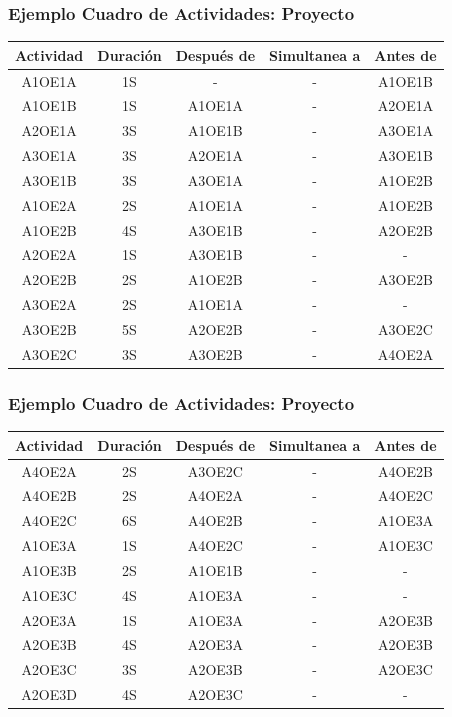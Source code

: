 \documentclass[aspectratio=169]{beamer}%
\begin{document}
\begin{frame}[fragile]
\frametitle{\textbf{Ejemplo Cuadro de Actividades: Proyecto}}
\justifying
\begin{center}
\begin{tabular}{|c|c|c|c|c|}\hline
  \textbf{Actividad}&\textbf{Duración} &\textbf{Después de} & \textbf{Simultanea a} & \textbf{Antes de}\\\hline
A1OE1A& 1S&-      &-&A1OE1B\\\hline
A1OE1B& 1S&A1OE1A &-&A2OE1A\\\hline
A2OE1A& 3S&A1OE1B &-&A3OE1A\\\hline
A3OE1A& 3S&A2OE1A &-&A3OE1B\\\hline
A3OE1B& 3S&A3OE1A &-&A1OE2B\\\hline
A1OE2A& 2S&A1OE1A &-&A1OE2B\\\hline
A1OE2B& 4S&A3OE1B &-&A2OE2B\\\hline
A2OE2A& 1S&A3OE1B &-&-\\\hline
A2OE2B& 2S&A1OE2B &-&A3OE2B\\\hline
A3OE2A& 2S&A1OE1A &-&-\\\hline
A3OE2B& 5S&A2OE2B &-&A3OE2C\\\hline
A3OE2C& 3S&A3OE2B &-&A4OE2A\\\hline
\end{tabular}
\end{center}
\end{frame}

\begin{frame}[fragile]
\frametitle{\textbf{Ejemplo Cuadro de Actividades: Proyecto}}
\justifying
\begin{center}
\begin{tabular}{|c|c|c|c|c|}\hline
  \textbf{Actividad}&\textbf{Duración} &\textbf{Después de} & \textbf{Simultanea a} & \textbf{Antes de}\\\hline
A4OE2A& 2S&A3OE2C &-&A4OE2B\\\hline
A4OE2B& 2S&A4OE2A &-&A4OE2C\\\hline
A4OE2C& 6S&A4OE2B &-&A1OE3A\\\hline
A1OE3A& 1S&A4OE2C &-&A1OE3C\\\hline
A1OE3B& 2S&A1OE1B &-&-\\\hline
A1OE3C& 4S&A1OE3A &-&-\\\hline
A2OE3A& 1S&A1OE3A &-&A2OE3B\\\hline
A2OE3B& 4S&A2OE3A &-&A2OE3B\\\hline
A2OE3C& 3S&A2OE3B &-&A2OE3C\\\hline
A2OE3D& 4S&A2OE3C &-&-\\\hline
\end{tabular}
\end{center}
\end{frame}
\end{document}
